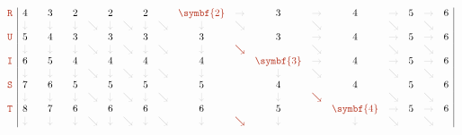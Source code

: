 \[\begin{array}{r|ccccccccccccccccccc|}
\mbox{\Str{R}} & 4 &  & 3 &  & 2 &  & 2 &  & 2 &  & \color{JEred}\symbf{2} & \color{JEgray}\rightarrow & 3 & \color{JEgray}\rightarrow & 4 & \color{JEgray}\rightarrow & 5 & \color{JEgray}\rightarrow & 6\\
 & \color{JEgray}\downarrow &  & \color{JEgray}\downarrow &  & \color{JEgray}\downarrow & \color{JEgray}\searrow & \color{JEgray}\downarrow & \color{JEgray}\searrow & \color{JEgray}\downarrow & \color{JEgray}\searrow & \color{JEgray}\downarrow & \color{JEgray}\searrow &  & \color{JEgray}\searrow &  & \color{JEgray}\searrow &  & \color{JEgray}\searrow & \\
\mbox{\Str{U}} & 5 &  & 4 &  & 3 &  & 3 &  & 3 &  & 3 &  & 3 & \color{JEgray}\rightarrow & 4 & \color{JEgray}\rightarrow & 5 & \color{JEgray}\rightarrow & 6\\
 & \color{JEgray}\downarrow &  & \color{JEgray}\downarrow &  & \color{JEgray}\downarrow & \color{JEgray}\searrow & \color{JEgray}\downarrow & \color{JEgray}\searrow & \color{JEgray}\downarrow & \color{JEgray}\searrow & \color{JEgray}\downarrow & \color{JEred}\searrow &  & \color{JEgray}\searrow &  & \color{JEgray}\searrow &  & \color{JEgray}\searrow & \\
\mbox{\Str{I}} & 6 &  & 5 &  & 4 &  & 4 &  & 4 &  & 4 &  & \color{JEred}\symbf{3} & \color{JEgray}\rightarrow & 4 & \color{JEgray}\rightarrow & 5 & \color{JEgray}\rightarrow & 6\\
 & \color{JEgray}\downarrow &  & \color{JEgray}\downarrow &  & \color{JEgray}\downarrow & \color{JEgray}\searrow & \color{JEgray}\downarrow & \color{JEgray}\searrow & \color{JEgray}\downarrow & \color{JEgray}\searrow & \color{JEgray}\downarrow &  & \color{JEgray}\downarrow & \color{JEgray}\searrow &  & \color{JEgray}\searrow &  & \color{JEgray}\searrow & \\
\mbox{\Str{S}} & 7 &  & 6 &  & 5 &  & 5 &  & 5 &  & 5 &  & 4 &  & 4 &  & 5 &  & 6\\
 & \color{JEgray}\downarrow &  & \color{JEgray}\downarrow &  & \color{JEgray}\downarrow & \color{JEgray}\searrow & \color{JEgray}\downarrow & \color{JEgray}\searrow & \color{JEgray}\downarrow & \color{JEgray}\searrow & \color{JEgray}\downarrow &  & \color{JEgray}\downarrow & \color{JEred}\searrow &  & \color{JEgray}\searrow &  & \color{JEgray}\searrow & \\
\mbox{\Str{T}} & 8 &  & 7 &  & 6 &  & 6 &  & 6 &  & 6 &  & 5 &  & \color{JEred}\symbf{4} & \color{JEgray}\rightarrow & 5 & \color{JEgray}\rightarrow & 6\\
 & \color{JEgray}\downarrow &  & \color{JEgray}\downarrow &  & \color{JEgray}\downarrow & \color{JEgray}\searrow & \color{JEgray}\downarrow & \color{JEgray}\searrow & \color{JEgray}\downarrow & \color{JEgray}\searrow & \color{JEgray}\downarrow & \color{JEred}\searrow & \color{JEgray}\downarrow &  & \color{JEgray}\downarrow & \color{JEgray}\searrow &  & \color{JEgray}\searrow & \\

\end{array}\]

